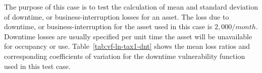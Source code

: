 The purpose of this case is to test the calculation of mean and standard deviation of downtime, or business-interruption losses for an asset. The loss due to downtime, or business-interruption for the asset used in this case is $2,000 / month$. Downtime losses are usually specified per unit time the asset will be unavailable for occupancy or use. Table~\ref{tab:vf-ln-tax1-dnt} shows the mean loss ratios and corresponding coefficients of variation for the downtime vulnerability function used in this test case.

